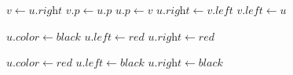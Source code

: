 \documentclass[a4paper, 11pt]{article}
\begin{document}
{\begin{minipage}{0.48\textwidth}
	\begin{algorithm}[H]
		\DontPrintSemicolon
		$v\longleftarrow u.\textit{right}$\;
		$v.p\longleftarrow u.p$\;
		$u.p\longleftarrow v$\;
		$u.\textit{right}\longleftarrow v.\textit{left}$\;
		$v.\textit{left}\longleftarrow u$\;
		\caption{$(u)$}
	\end{algorithm}
\end{minipage}
\begin{minipage}{0.48\textwidth}
\begin{algorithm}[H]
	\DontPrintSemicolon
	$u.\textit{color}\longleftarrow \textit{black}$\;
	$u.\textit{left}\longleftarrow \textit{red}$\;
	$u.\textit{right}\longleftarrow \textit{red}$\;
	\caption{($u$)}
\end{algorithm}
\end{minipage}
\hfill
\begin{minipage}{0.48\textwidth}
\begin{algorithm}[H]
	\DontPrintSemicolon
	$u.\textit{color}\longleftarrow \textit{red}$\;
	$u.\textit{left}\longleftarrow \textit{black}$\;
	$u.\textit{right}\longleftarrow \textit{black}$\;
	\caption{($u$)}
\end{algorithm}
\end{minipage}

}
\end{document}
